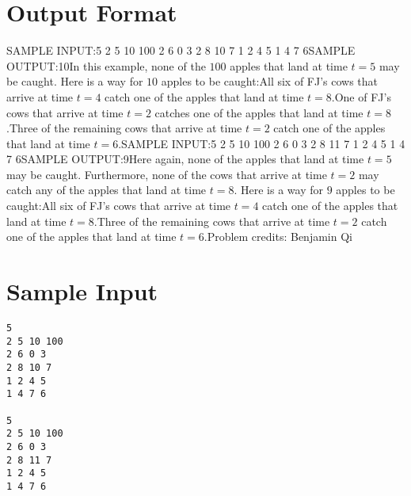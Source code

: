 \documentclass[12pt]{article}
\begin{document}
\section*{Output Format}
SAMPLE INPUT:5
2 5 10 100
2 6 0 3
2 8 10 7
1 2 4 5
1 4 7 6SAMPLE OUTPUT:10In this example, none of the $100$ apples that land at time $t=5$ may be caught. Here is a way
for $10$ apples to be caught:All six of FJ's cows that arrive at time $t=4$ catch one of the apples that
land at time $t=8$.One of FJ's cows that arrive at time $t=2$ catches one of the apples that
land at time $t=8$.Three of the remaining cows that arrive at time $t=2$ catch one of the
apples that land at time $t=6$.SAMPLE INPUT:5
2 5 10 100
2 6 0 3
2 8 11 7
1 2 4 5
1 4 7 6SAMPLE OUTPUT:9Here again, none of the apples that land at time $t=5$ may be caught. Furthermore,
none of the cows that arrive at time $t=2$ may catch any of the apples that land
at time $t=8$. Here is a way for $9$ apples to be caught:All six of FJ's cows that arrive at time $t=4$ catch one of the apples that
land at time $t=8$.Three of the remaining cows that arrive at time $t=2$ catch one of the
apples that land at time $t=6$.Problem credits: Benjamin Qi

\section*{Sample Input}
\begin{verbatim}
5
2 5 10 100
2 6 0 3
2 8 10 7
1 2 4 5
1 4 7 6

5
2 5 10 100
2 6 0 3
2 8 11 7
1 2 4 5
1 4 7 6
\end{verbatim}
\end{document}
